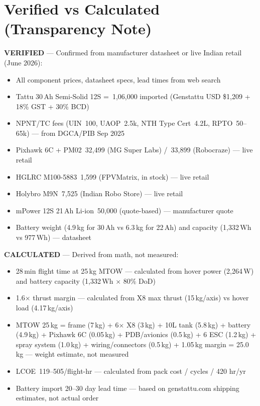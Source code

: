 \documentclass[11pt,a4paper]{article}
\newcommand{\Rs}{\rupee\,}
\begin{document}
\section{Verified vs Calculated (Transparency Note)}

\textbf{VERIFIED} --- Confirmed from manufacturer datasheet or live Indian retail (June 2026):
\begin{itemize}
  \item All component prices, datasheet specs, lead times from web search
  \item Tattu 30\,Ah Semi-Solid 12S = \Rs{}1,06,000 imported (Genstattu USD \$1,209 + 18\% GST + 30\% BCD)
  \item NPNT/TC fees (UIN \Rs{}100, UAOP \Rs{}2.5k, NTH Type Cert \Rs{}4.2L, RPTO \Rs{}50--65k) --- from DGCA/PIB Sep 2025
  \item Pixhawk 6C + PM02 \Rs{}32,499 (MG Super Labs) / \Rs{}33,899 (Robocraze) --- live retail
  \item HGLRC M100-5883 \Rs{}1,599 (FPVMatrix, in stock) --- live retail
  \item Holybro M9N \Rs{}7,525 (Indian Robo Store) --- live retail
  \item mPower 12S 21\,Ah Li-ion \Rs{}50,000 (quote-based) --- manufacturer quote
  \item Battery weight (4.9\,kg for 30\,Ah vs 6.3\,kg for 22\,Ah) and capacity (1,332\,Wh vs 977\,Wh) --- datasheet
\end{itemize}

\textbf{CALCULATED} --- Derived from math, not measured:
\begin{itemize}
  \item 28\,min flight time at 25\,kg MTOW --- calculated from hover power (2,264\,W) and battery capacity (1,332\,Wh $\times$ 80\% DoD)
  \item 1.6$\times$ thrust margin --- calculated from X8 max thrust (15\,kg/axis) vs hover load (4.17\,kg/axis)
  \item MTOW 25\,kg = frame (7\,kg) + 6$\times$ X8 (3\,kg) + 10L tank (5.8\,kg) + battery (4.9\,kg) + Pixhawk 6C (0.05\,kg) + PDB/avionics (0.5\,kg) + 6 ESC (1.2\,kg) + spray system (1.0\,kg) + wiring/connectors (0.5\,kg) + 1.05\,kg margin = 25.0\,kg --- weight estimate, not measured
  \item LCOE \Rs{}119--505/flight-hr --- calculated from pack cost / cycles / 420 hr/yr
  \item Battery import 20--30 day lead time --- based on genstattu.com shipping estimates, not actual order
\end{itemize}
\end{document}
